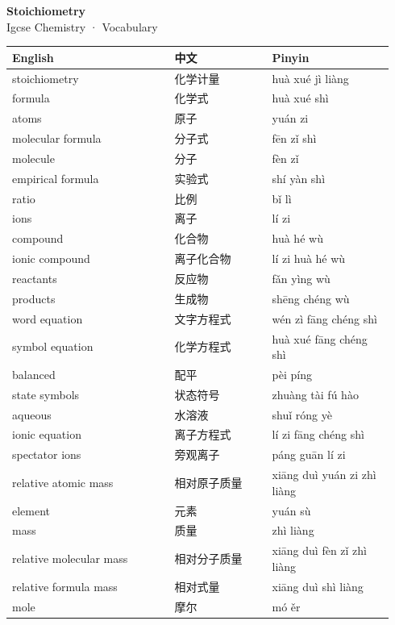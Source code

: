 \documentclass[11pt]{article}
\begin{document}
\begin{center}
  {\LARGE\bfseries Stoichiometry}\\[0.35em]
  {\large Igcse Chemistry · Vocabulary}
\end{center}
\vspace{0.6em}

\begin{longtable}{@{}p{0.40\linewidth}p{0.24\linewidth}p{0.30\linewidth}@{}}
\toprule
\textbf{English} & \textbf{中文} & \textbf{Pinyin} \\
\midrule
\endhead
\bottomrule
\endlastfoot
stoichiometry & 化学计量 & huà xué jì liàng \\
formula & 化学式 & huà xué shì \\
atoms & 原子 & yuán zi \\
molecular formula & 分子式 & fēn zǐ shì \\
molecule & 分子 & fèn zǐ \\
empirical formula & 实验式 & shí yàn shì \\
ratio & 比例 & bǐ lì \\
ions & 离子 & lí zi \\
compound & 化合物 & huà hé wù \\
ionic compound & 离子化合物 & lí zi huà hé wù \\
reactants & 反应物 & fǎn yìng wù \\
products & 生成物 & shēng chéng wù \\
word equation & 文字方程式 & wén zì fāng chéng shì \\
symbol equation & 化学方程式 & huà xué fāng chéng shì \\
balanced & 配平 & pèi píng \\
state symbols & 状态符号 & zhuàng tài fú hào \\
aqueous & 水溶液 & shuǐ róng yè \\
ionic equation & 离子方程式 & lí zi fāng chéng shì \\
spectator ions & 旁观离子 & páng guān lí zi \\
relative atomic mass & 相对原子质量 & xiāng duì yuán zi zhì liàng \\
element & 元素 & yuán sù \\
mass & 质量 & zhì liàng \\
relative molecular mass & 相对分子质量 & xiāng duì fèn zǐ zhì liàng \\
relative formula mass & 相对式量 & xiāng duì shì liàng \\
mole & 摩尔 & mó ěr \\

\end{longtable}
\end{document}
